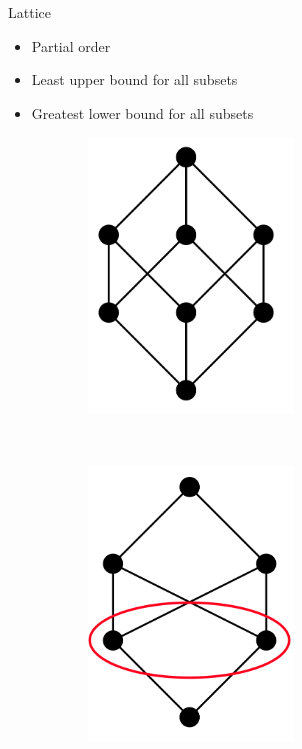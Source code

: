 \begin{frame}{Lattice}
  \begin{itemize}
  \item Partial order 
  \item Least upper bound for all subsets
  \item Greatest lower bound for all subsets
  \end{itemize}


  \begin{figure}
    \begin{subfigure}[b]{0.4\textwidth}
      \includegraphics[width=0.6\textwidth]{graphics/lattice}
    \end{subfigure}
    ~
    \begin{subfigure}[b]{0.4\textwidth}
      \includegraphics[width=0.6\textwidth]{graphics/notlatticepoints}
    \end{subfigure}    
  \end{figure}
\end{frame}

